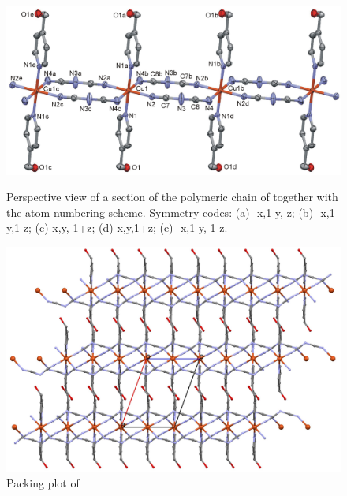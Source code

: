 \begin{figure}[htpb!]
\centering
\includegraphics[width=1\textwidth]{figures/CuD_4OMP_FIGm11.png}
\caption[Perspective view of ]{Perspective view of a section of the polymeric chain of  together with the atom numbering scheme. Symmetry codes: (a) -x,1-y,-z; (b) -x,1-y,1-z; (c) x,y,-1+z; (d) x,y,1+z; (e) -x,1-y,-1-z.}
\label{fig:CuD4HOMP_pv}
\vspace{\floatsep}
\includegraphics[width=1\textwidth]{figures/cud_4omp_CB.png}
\caption{Packing plot of }
\label{fig:CuD4HOMP_packv}
\end{figure}

